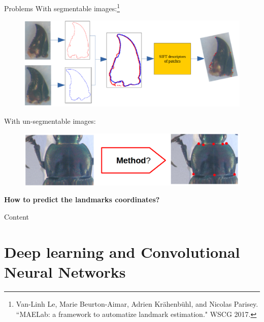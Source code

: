 \documentclass[10pt]{beamer}
\begin{document}
\begin{frame}{Problems}{}
  \small{With segmentable images:\footnote{\tiny{Van-Linh Le, Marie Beurton-Aimar, Adrien Krähenbühl, and Nicolas Parisey. ``MAELab: a framework to automatize landmark estimation." WSCG 2017.}}}
	\begin{figure}[htbp]
  		\centering
   	 	\includegraphics[scale=.18]{images/sift_method}
	\end{figure}
\pause
	\small{With un-segmentable images: }
  \begin{figure}[htbp]
        \centering
        \includegraphics[scale=.17]{images/method}
	\end{figure}
\pause	
	\textbf{\color{red}How to predict the landmarks coordinates?}
\end{frame}

\begin{frame}{Content}{}
\tableofcontents
\end{frame}
\section{Deep learning and Convolutional Neural Networks}
\end{document}
